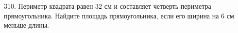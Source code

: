 310. Периметр квадрата равен 32 см и составляет четверть периметра прямоугольника. Найдите площадь прямоугольника, если его ширина на 6 см меньше длины.\\
